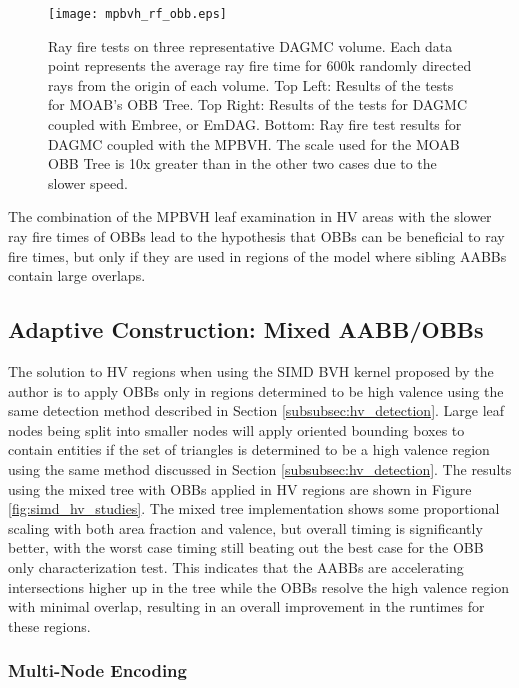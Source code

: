 \begin{figure}[H]
  \centering
  \texttt{[image: mpbvh\_rf\_obb.eps]}
  \caption{Ray fire tests on three representative DAGMC volume. Each data point
    represents the average ray fire time for 600k randomly directed rays from
    the origin of each volume. Top Left: Results of the tests for MOAB's OBB
    Tree. Top Right: Results of the tests for DAGMC coupled with Embree, or
    EmDAG. Bottom: Ray fire test results for DAGMC coupled with the MPBVH. The
    scale used for the MOAB OBB Tree is 10x greater than in the other two cases
    due to the slower speed.}
  \label{fig:rf_test_results_obbs}
\end{figure}

The combination of the MPBVH leaf examination in HV areas with the slower ray
fire times of OBBs lead to the hypothesis that OBBs can be beneficial to ray
fire times, but only if they are used in regions of the model where sibling
AABBs contain large overlaps.

\subsection{Adaptive Construction: Mixed AABB/OBBs}

The solution to HV regions when using the SIMD BVH
kernel proposed by the author is to apply OBBs only in regions determined to be
high valence using the same detection method described in Section
\ref{subsubsec:hv_detection}. Large leaf nodes being split into smaller nodes
will apply oriented bounding boxes to contain entities if the set of triangles
is determined to be a high valence region using the same method discussed in
Section \ref{subsubsec:hv_detection}.  The results using the mixed tree with
OBBs applied in HV regions are shown in Figure \ref{fig:simd_hv_studies}. The
mixed tree implementation shows some proportional scaling with both area
fraction and valence, but overall timing is significantly better, with the worst
case timing still beating out the best case for the OBB only characterization
test. This indicates that the AABBs are accelerating intersections higher up in
the tree while the OBBs resolve the high valence region with minimal overlap,
resulting in an overall improvement in the runtimes for these regions.

\subsubsection{Multi-Node Encoding}

